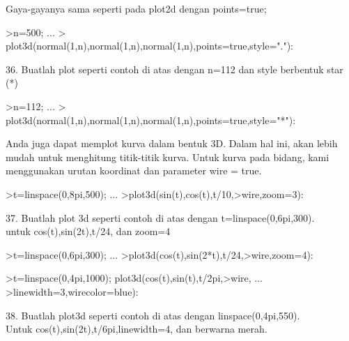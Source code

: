 \documentclass[a4paper,10pt]{article}
\begin{document}
\begin{eulernotebook}
\begin{eulercomment}
Gaya-gayanya sama seperti pada plot2d dengan points=true;
\end{eulercomment}
\begin{eulerprompt}
>n=500;  ...
>  plot3d(normal(1,n),normal(1,n),normal(1,n),points=true,style="."):
\end{eulerprompt}
\begin{eulercomment}
36. Buatlah plot seperti contoh di atas dengan n=112 dan style
berbentuk star (*)
\end{eulercomment}
\begin{eulerprompt}
>n=112;  ...
>  plot3d(normal(1,n),normal(1,n),normal(1,n),points=true,style="*"): 
\end{eulerprompt}
\begin{eulercomment}
Anda juga dapat memplot kurva dalam bentuk 3D. Dalam hal ini, akan
lebih mudah untuk menghitung titik-titik kurva. Untuk kurva pada
bidang, kami menggunakan urutan koordinat dan parameter wire = true.
\end{eulercomment}
\begin{eulerprompt}
>t=linspace(0,8pi,500); ...
>plot3d(sin(t),cos(t),t/10,>wire,zoom=3):
\end{eulerprompt}
\begin{eulercomment}
37. Buatlah plot 3d seperti contoh di atas dengan
t=linspace(0,6pi,300).\\
untuk cos(t),sin(2t),t/24, dan zoom=4
\end{eulercomment}
\begin{eulerprompt}
>t=linspace(0,6pi,300); ...
>plot3d(cos(t),sin(2*t),t/24,>wire,zoom=4): 
\end{eulerprompt}
\begin{eulerprompt}
>t=linspace(0,4pi,1000); plot3d(cos(t),sin(t),t/2pi,>wire, ...
>linewidth=3,wirecolor=blue):
\end{eulerprompt}
\begin{eulercomment}
38. Buatlah plot3d seperti contoh di atas dengan linspace(0,4pi,550).\\
Untuk cos(t),sin(2t),t/6pi,linewidth=4, dan berwarna merah.
\end{eulercomment}
\begin{eulerprompt}

\end{eulerprompt}
\end{eulernotebook}
\end{document}
